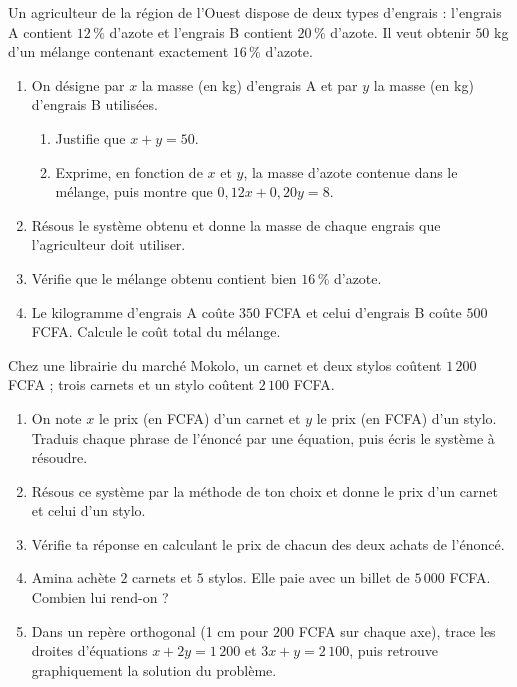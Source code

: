 \documentclass[11pt]{article}
\begin{document}
\begin{exercice}
Un agriculteur de la région de l'Ouest dispose de deux types d'engrais : l'engrais A contient $12\,\%$ d'azote et l'engrais B contient $20\,\%$ d'azote. Il veut obtenir $50$ kg d'un mélange contenant exactement $16\,\%$ d'azote.
\begin{enumerate}
\item On désigne par $x$ la masse (en kg) d'engrais A et par $y$ la masse (en kg) d'engrais B utilisées.
\begin{enumerate}
\item Justifie que $x + y = 50$.
\item Exprime, en fonction de $x$ et $y$, la masse d'azote contenue dans le mélange, puis montre que $0{,}12x + 0{,}20y = 8$.
\end{enumerate}
\item Résous le système obtenu et donne la masse de chaque engrais que l'agriculteur doit utiliser.
\item Vérifie que le mélange obtenu contient bien $16\,\%$ d'azote.
\item Le kilogramme d'engrais A coûte $350$ FCFA et celui d'engrais B coûte $500$ FCFA. Calcule le coût total du mélange.
\end{enumerate}
\end{exercice}

\begin{exercice}
Chez une librairie du marché Mokolo, un carnet et deux stylos coûtent $1\,200$ FCFA ; trois carnets et un stylo coûtent $2\,100$ FCFA.
\begin{enumerate}
\item On note $x$ le prix (en FCFA) d'un carnet et $y$ le prix (en FCFA) d'un stylo. Traduis chaque phrase de l'énoncé par une équation, puis écris le système à résoudre.
\item Résous ce système par la méthode de ton choix et donne le prix d'un carnet et celui d'un stylo.
\item Vérifie ta réponse en calculant le prix de chacun des deux achats de l'énoncé.
\item Amina achète $2$ carnets et $5$ stylos. Elle paie avec un billet de $5\,000$ FCFA. Combien lui rend-on ?
\item Dans un repère orthogonal (1 cm pour $200$ FCFA sur chaque axe), trace les droites d'équations $x + 2y = 1\,200$ et $3x + y = 2\,100$, puis retrouve graphiquement la solution du problème.
\end{enumerate}
\end{exercice}
\end{document}
